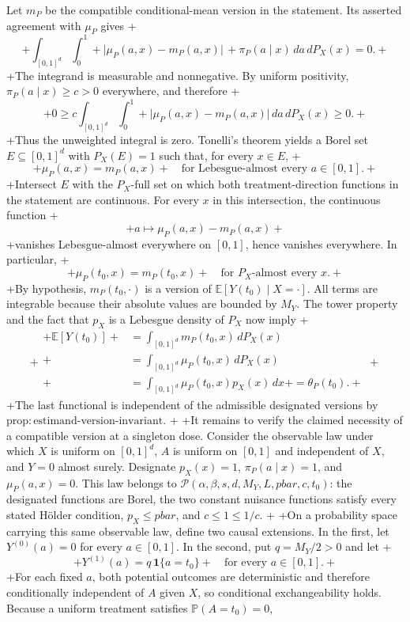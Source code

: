 Let \(m_P\) be the compatible conditional-mean version in the statement. Its asserted agreement with \(\mu_P\) gives
+\[
+\int_{[0,1]^d}\int_0^1
+\lvert \mu_P(a,x)-m_P(a,x)\rvert\,
+\pi_P(a\mid x)\,da\,dP_X(x)=0.
+\]
+The integrand is measurable and nonnegative. By uniform positivity, \(\pi_P(a\mid x)\ge c>0\) everywhere, and therefore
+\[
+0\ge c\int_{[0,1]^d}\int_0^1
+\lvert \mu_P(a,x)-m_P(a,x)\rvert\,da\,dP_X(x)\ge0.
+\]
+Thus the unweighted integral is zero. Tonelli's theorem yields a Borel set \(E\subseteq[0,1]^d\) with \(P_X(E)=1\) such that, for every \(x\in E\),
+\[
+\mu_P(a,x)=m_P(a,x)
+\quad\text{for Lebesgue-almost every }a\in[0,1].
+\]
+Intersect \(E\) with the \(P_X\)-full set on which both treatment-direction functions in the statement are continuous. For every \(x\) in this intersection, the continuous function
+\[
+a\longmapsto \mu_P(a,x)-m_P(a,x)
+\]
+vanishes Lebesgue-almost everywhere on \([0,1]\), hence vanishes everywhere. In particular,
+\[
+\mu_P(t_0,x)=m_P(t_0,x)
+\quad\text{for }P_X\text{-almost every }x.
+\]
+By hypothesis, \(m_P(t_0,\cdot)\) is a version of \(\mathbb E[Y(t_0)\mid X=\cdot]\). All terms are integrable because their absolute values are bounded by \(M_Y\). The tower property and the fact that \(p_X\) is a Lebesgue density of \(P_X\) now imply
+\[
+\begin{aligned}
+\mathbb E[Y(t_0)]
+&=\int_{[0,1]^d}m_P(t_0,x)\,dP_X(x)\\
+&=\int_{[0,1]^d}\mu_P(t_0,x)\,dP_X(x)\\
+&=\int_{[0,1]^d}\mu_P(t_0,x)p_X(x)\,dx
+=\theta_P(t_0).
+\end{aligned}
+\]
+The last functional is independent of the admissible designated versions by \(\mathrm{prop:estimand\text{-}version\text{-}invariant}\).
+
+It remains to verify the claimed necessity of a compatible version at a singleton dose. Consider the observable law under which \(X\) is uniform on \([0,1]^d\), \(A\) is uniform on \([0,1]\) and independent of \(X\), and \(Y=0\) almost surely. Designate \(p_X(x)=1\), \(\pi_P(a\mid x)=1\), and \(\mu_P(a,x)=0\). This law belongs to \(\mathcal P(\alpha,\beta,s,d,M_Y,L,pbar,c,t_0)\): the designated functions are Borel, the two constant nuisance functions satisfy every stated Hölder condition, \(p_X\le pbar\), and \(c\le1\le1/c\).
+
+On a probability space carrying this same observable law, define two causal extensions. In the first, let \(Y^{(0)}(a)=0\) for every \(a\in[0,1]\). In the second, put \(q=M_Y/2>0\) and let
+\[
+Y^{(1)}(a)=q\,\mathbf 1\{a=t_0\}
+\quad\text{for every }a\in[0,1].
+\]
+For each fixed \(a\), both potential outcomes are deterministic and therefore conditionally independent of \(A\) given \(X\), so conditional exchangeability holds. Because a uniform treatment satisfies \(\mathbb P(A=t_0)=0\),
